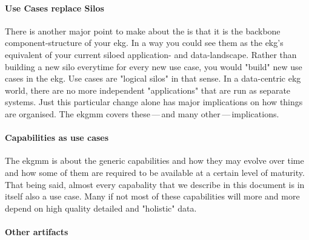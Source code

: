 \paragraph{Use Cases replace Silos}

There is another major point to make about the  is that it is the backbone component-structure
of your \gls{ekg}.
In a way you could see them as the \gls{ekg}'s equivalent of your current siloed application- and data-landscape.
Rather than building a new silo everytime for every new use case, you would "build" new use cases in the \gls{ekg}.
Use cases are "logical silos" in that sense. In a data-centric \gls{ekg} world, there are no more independent
"applications" that are run as separate systems.
Just this particular change alone has major implications on how things are organised.
The \gls{ekgmm} covers these\,---\,and many other\,---\,implications.

\paragraph{Capabilities as use cases}

The \gls{ekgmm} is about the generic capabilities and how they may evolve over time and how some of them are
required to be available at a certain level of maturity.
That being said, almost every capabality that we describe in this document is in itself also a use case.
Many if not most of these capabilities will more and more depend on high quality detailed and "holistic" data.

\paragraph{Other artifacts}

